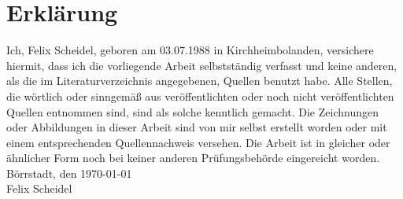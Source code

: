 \section*{Erkl\"arung}
 
 
\normalsize
Ich, Felix Scheidel, geboren am 03.07.1988 in Kirchheimbolanden, versichere hiermit, dass ich die vorliegende Arbeit selbstständig verfasst und keine anderen, als die im Literaturverzeichnis angegebenen, Quellen benutzt habe.
\newline
Alle Stellen, die wörtlich oder sinngemäß aus veröffentlichten oder noch nicht veröffentlichten Quellen entnommen sind, sind als solche kenntlich gemacht. Die Zeichnungen oder Abbildungen in dieser Arbeit sind von mir selbst erstellt worden oder mit einem entsprechenden Quellennachweis versehen.
\newline\newline
Die Arbeit ist in gleicher oder ähnlicher Form noch bei keiner anderen Prüfungsbehörde eingereicht worden.
\vspace{5em}
\\ Börrstadt, den \today \\ Felix Scheidel